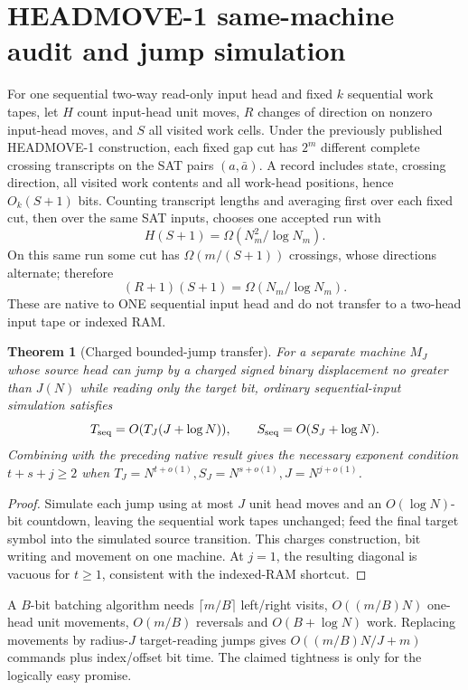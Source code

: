 \documentclass[11pt]{article}
\newtheorem{theorem}{Theorem}
\begin{document}
\section{HEADMOVE-1 same-machine audit and jump simulation}
For one sequential two-way read-only input head and fixed $k$ sequential work tapes, let $H$ count input-head unit moves, $R$ changes of direction on nonzero input-head moves, and $S$ all visited work cells. Under the previously published HEADMOVE-1 construction, each fixed gap cut has $2^m$ different complete crossing transcripts on the SAT pairs $(a,\bar a)$. A record includes state, crossing direction, all visited work contents and all work-head positions, hence $O_k(S+1)$ bits. Counting transcript lengths and averaging first over each fixed cut, then over the same SAT inputs, chooses one accepted run with
\[
H(S+1)=\Omega(N_m^2/\log N_m).
\]
On this same run some cut has $\Omega(m/(S+1))$ crossings, whose directions alternate; therefore
\[
(R+1)(S+1)=\Omega(N_m/\log N_m).
\]
These are native to ONE sequential input head and do not transfer to a two-head input tape or indexed RAM.

\begin{theorem}[Charged bounded-jump transfer]
For a separate machine $M_J$ whose source head can jump by a charged signed binary displacement no greater than $J(N)$ while reading only the target bit, ordinary sequential-input simulation satisfies
\[
T_{\rm seq}=O(T_J(J+\log N)),\qquad S_{\rm seq}=O(S_J+\log N).
\]
Combining with the preceding native result gives the necessary exponent condition $t+s+j\ge2$ when $T_J=N^{t+o(1)},S_J=N^{s+o(1)},J=N^{j+o(1)}$.
\end{theorem}
\begin{proof}
Simulate each jump using at most $J$ unit head moves and an $O(\log N)$-bit countdown, leaving the sequential work tapes unchanged; feed the final target symbol into the simulated source transition. This charges construction, bit writing and movement on one machine. At $j=1$, the resulting diagonal is vacuous for $t\ge1$, consistent with the indexed-RAM shortcut.
\end{proof}
A $B$-bit batching algorithm needs $\lceil m/B\rceil$ left/right visits, $O((m/B)N)$ one-head unit movements, $O(m/B)$ reversals and $O(B+\log N)$ work. Replacing movements by radius-$J$ target-reading jumps gives $O((m/B)N/J+m)$ commands plus index/offset bit time. The claimed tightness is only for the logically easy promise.
\end{document}

